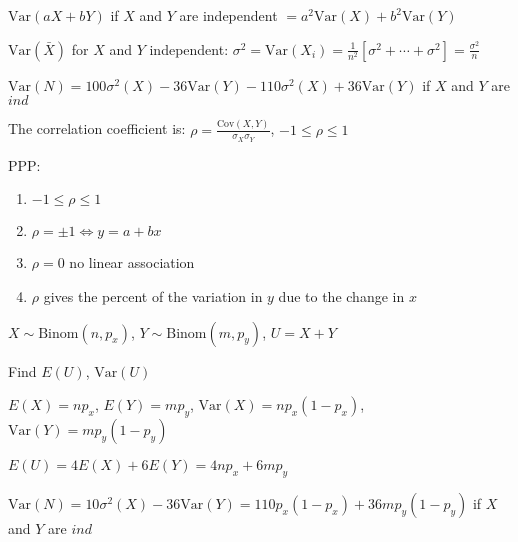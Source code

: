$\text{Var}(aX + bY)$ if $X$ and $Y$ are independent $= a^2 \text{Var}(X) + b^2 \text{Var}(Y)$

$\text{Var}(\bar{X})$ for $X$ and $Y$ independent: $\sigma^2 = \text{Var}(X_i) = \frac{1}{n^2}[\sigma^2 + \cdots + \sigma^2] = \frac{\sigma^2}{n}$

$\text{Var}(N) = 100\sigma^2(X) - 36\text{Var}(Y) - 110\sigma^2(X) + 36\text{Var}(Y)$ if $X$ and $Y$ are $ind$

\begin{definition}
The correlation coefficient is: $\rho = \frac{\text{Cov}(X,Y)}{\sigma_X \sigma_Y}$, $-1 \leq \rho \leq 1$
\end{definition}

PPP:
\begin{enumerate}
\item $-1 \leq \rho \leq 1$
\item $\rho = \pm 1 \Leftrightarrow y = a + bx$
\item $\rho = 0$ no linear association
\item $\rho$ gives the percent of the variation in $y$ due to the change in $x$
\end{enumerate}

\begin{example}[20]
$X \sim \text{Binom}(n, p_x)$, $Y \sim \text{Binom}(m, p_y)$, $U = X + Y$

Find $E(U)$, $\text{Var}(U)$

$E(X) = np_x$, $E(Y) = mp_y$, $\text{Var}(X) = np_x(1 - p_x)$, $\text{Var}(Y) = mp_y(1 - p_y)$

$E(U) = 4E(X) + 6E(Y) = 4np_x + 6mp_y$

$\text{Var}(N) = 10\sigma^2(X) - 36\text{Var}(Y) = 110p_x(1 - p_x) + 36mp_y(1 - p_y)$ if $X$ and $Y$ are $ind$
\end{example}
